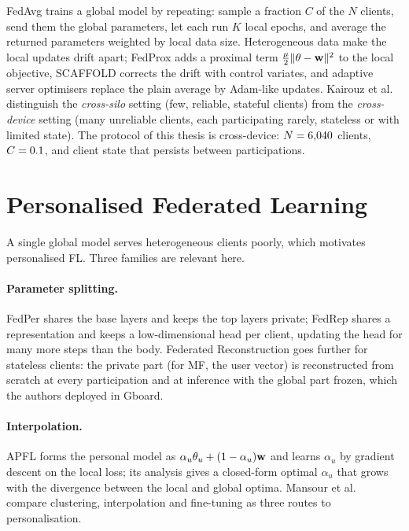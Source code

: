 FedAvg \cite{mcmahan2017fedavg} trains a global model by repeating: sample a fraction $C$ of
the $N$ clients, send them the global parameters, let each run $K$ local epochs, and average
the returned parameters weighted by local data size. Heterogeneous data make the local updates
drift apart; FedProx \cite{li2020fedprox} adds a proximal term $\frac{\mu}{2}\|\theta -
\mathbf{w}\|^2$ to the local objective, SCAFFOLD \cite{karimireddy2020scaffold} corrects the drift
with control variates, and adaptive server optimisers \cite{reddi2021adaptive} replace the
plain average by Adam-like updates. Kairouz et al.\ \cite{kairouz2021advances} distinguish the
\emph{cross-silo} setting (few, reliable, stateful clients) from the \emph{cross-device} setting
(many unreliable clients, each participating rarely, stateless or with limited state). The
protocol of this thesis is cross-device: $N=6{,}040$ clients, $C=0.1$, and
client state that persists between participations.

\section{Personalised Federated Learning}
\label{sec:lit-pfl}

A single global model serves heterogeneous clients poorly, which motivates personalised FL.
Three families are relevant here.

\paragraph{Parameter splitting.} FedPer \cite{arivazhagan2019fedper} shares the base layers and
keeps the top layers private; FedRep \cite{collins2021fedrep} shares a representation and keeps a
low-dimensional head per client, updating the head for many more steps than the body. Federated
Reconstruction \cite{singhal2021fedrecon} goes further for stateless clients: the private part
(for MF, the user vector) is reconstructed from scratch at every participation and at inference
with the global part frozen, which the authors deployed in Gboard.

\paragraph{Interpolation.} APFL \cite{deng2020apfl} forms the personal model as $\alpha_u
\theta_u + (1-\alpha_u)\mathbf{w}$ and learns $\alpha_u$ by gradient descent on the local loss;
its analysis gives a closed-form optimal $\alpha_u$ that grows with the divergence between the
local and global optima. Mansour et al.\ \cite{mansour2020three} compare clustering,
interpolation and fine-tuning as three routes to personalisation.

